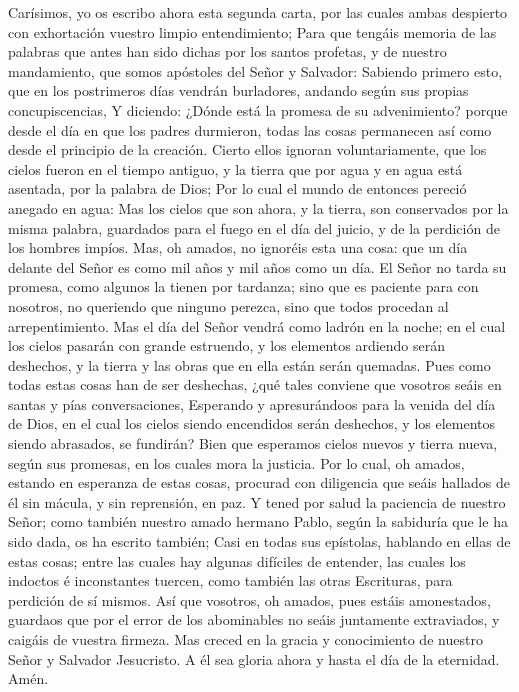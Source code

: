  Carísimos, yo os escribo ahora esta segunda carta, por las
cuales ambas despierto con exhortación vuestro limpio entendimiento;
 Para que tengáis memoria de las palabras que antes han sido
dichas por los santos profetas, y de nuestro mandamiento, que somos
apóstoles del Señor y Salvador:  Sabiendo primero esto, que
en los postrimeros días vendrán burladores, andando según sus propias
concupiscencias,  Y diciendo: ¿Dónde está la promesa de su
advenimiento? porque desde el día en que los padres durmieron, todas las
cosas permanecen así como desde el principio de la creación.
 Cierto ellos ignoran voluntariamente, que los cielos fueron
en el tiempo antiguo, y la tierra que por agua y en agua está asentada,
por la palabra de Dios;  Por lo cual el mundo de entonces
pereció anegado en agua:  Mas los cielos que son ahora, y la
tierra, son conservados por la misma palabra, guardados para el fuego en
el día del juicio, y de la perdición de los hombres impíos. 
Mas, oh amados, no ignoréis esta una cosa: que un día delante del Señor
es como mil años y mil años como un día.  El Señor no tarda
su promesa, como algunos la tienen por tardanza; sino que es paciente
para con nosotros, no queriendo que ninguno perezca, sino que todos
procedan al arrepentimiento.  Mas el día del Señor vendrá
como ladrón en la noche; en el cual los cielos pasarán con grande
estruendo, y los elementos ardiendo serán deshechos, y la tierra y las
obras que en ella están serán quemadas.  Pues como todas
estas cosas han de ser deshechas, ¿qué tales conviene que vosotros seáis
en santas y pías conversaciones,  Esperando y apresurándoos
para la venida del día de Dios, en el cual los cielos siendo encendidos
serán deshechos, y los elementos siendo abrasados, se fundirán?
 Bien que esperamos cielos nuevos y tierra nueva, según sus
promesas, en los cuales mora la justicia.  Por lo cual, oh
amados, estando en esperanza de estas cosas, procurad con diligencia que
seáis hallados de él sin mácula, y sin reprensión, en paz. 
Y tened por salud la paciencia de nuestro Señor; como también nuestro
amado hermano Pablo, según la sabiduría que le ha sido dada, os ha
escrito también;  Casi en todas sus epístolas, hablando en
ellas de estas cosas; entre las cuales hay algunas difíciles de
entender, las cuales los indoctos é inconstantes tuercen, como también
las otras Escrituras, para perdición de sí mismos.  Así que
vosotros, oh amados, pues estáis amonestados, guardaos que por el error
de los abominables no seáis juntamente extraviados, y caigáis de vuestra
firmeza.  Mas creced en la gracia y conocimiento de nuestro
Señor y Salvador Jesucristo. A él sea gloria ahora y hasta el día de la
eternidad. Amén.
